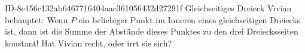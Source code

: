 \begin{exercise}
      {ID-8e156c132ab6467716404aac361056432d27291f}
      {Gleichseitiges Dreieck}
  \ifproblem\problem
    Vivian behauptet: \glqq Wenn $P$ ein beliebiger Punkt im Inneren eines
    gleichseitigen Dreiecks ist, dann ist die Summe der Abstände dieses Punktes
    zu den drei Dreiecksseiten konstant!\grqq{} Hat Vivian recht, oder irrt
    sie sich?
  \fi
\end{exercise}
